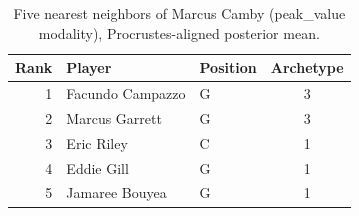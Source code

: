 \begin{table}[htbp]
  \centering\small
  \begin{tabular}{rllc}
    \toprule
    Rank & Player & Position & Archetype \\
    \midrule
    1 & Facundo Campazzo & G & 3 \\
    2 & Marcus Garrett & G & 3 \\
    3 & Eric Riley & C & 1 \\
    4 & Eddie Gill & G & 1 \\
    5 & Jamaree Bouyea & G & 1 \\
    \bottomrule
  \end{tabular}
  \caption{Five nearest neighbors of Marcus Camby (peak_value modality), Procrustes-aligned posterior mean.}
  \label{tab:Marcus_Camby_neighbors_peak_value}
\end{table}

